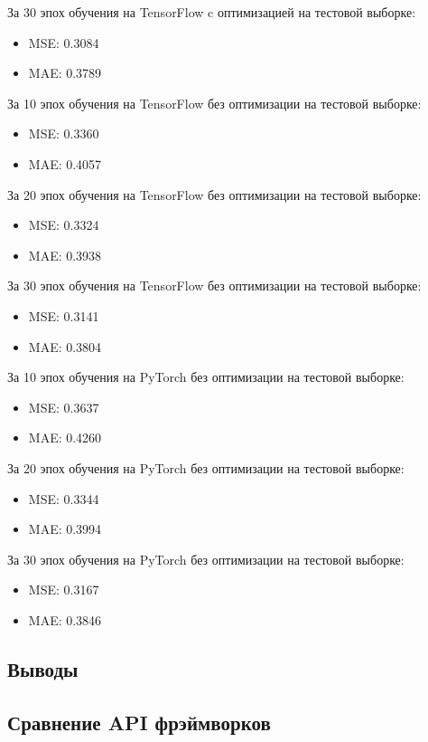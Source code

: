 \documentclass[a4paper,12pt,titlepage,final]{article}
\begin{document}
За 30 эпох обучения на TensorFlow c оптимизацией на тестовой выборке:
\begin{itemize}
    \item MSE: 0.3084
    \item MAE: 0.3789
\end{itemize}
За 10 эпох обучения на TensorFlow без оптимизации на тестовой выборке:
\begin{itemize}
    \item MSE: 0.3360
    \item MAE: 0.4057
\end{itemize}
За 20 эпох обучения на TensorFlow без оптимизации на тестовой выборке:
\begin{itemize}
    \item MSE: 0.3324
    \item MAE: 0.3938
\end{itemize}
За 30 эпох обучения на TensorFlow без оптимизации на тестовой выборке:
\begin{itemize}
    \item MSE: 0.3141
    \item MAE: 0.3804
\end{itemize}
За 10 эпох обучения на PyTorch без оптимизации на тестовой выборке:
\begin{itemize}
    \item MSE: 0.3637
    \item MAE: 0.4260
\end{itemize}
За 20 эпох обучения на PyTorch без оптимизации на тестовой выборке:
\begin{itemize}
    \item MSE: 0.3344
    \item MAE: 0.3994
\end{itemize}
За 30 эпох обучения на PyTorch без оптимизации на тестовой выборке:
\begin{itemize}
    \item MSE: 0.3167
    \item MAE: 0.3846
\end{itemize}
\newpage

\begin{center}
\section{Выводы}
\subsection{Сравнение API фрэймворков}
\end{center}
\end{document}
